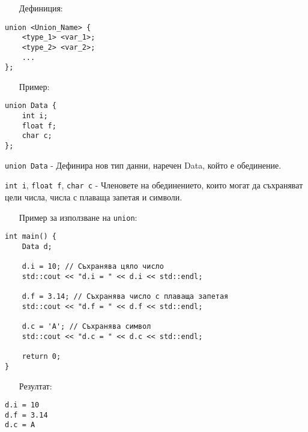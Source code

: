 \documentclass[oneside]{book}
\newcommand*{\code}[1]{\texttt{#1}}
\begin{document}
\begin{itemize}\item[Дефиниция:]\end{itemize}\vspace{-12pt}
\begin{mdframed}\begin{lstlisting}
union <Union_Name> {
    <type_1> <var_1>;
    <type_2> <var_2>;
    ...
};
\end{lstlisting}\end{mdframed}

\begin{itemize}\item[Пример:]\end{itemize}\vspace{-12pt}
\begin{mdframed}\begin{lstlisting}
union Data {
    int i;
    float f;
    char c;
};
\end{lstlisting}\end{mdframed}

\code{union Data} - Дефинира нов тип данни, наречен Data, който е обединение.

\code{int i}, \code{float f}, \code{char c} - Членовете на обединението, които могат да съхраняват цели числа, числа с плаваща запетая и символи.

\begin{itemize}\item[Пример] за използване на \code{union}:\end{itemize}
\begin{mdframed}\begin{lstlisting}
int main() {
    Data d;

    d.i = 10; // Съхранява цяло число
    std::cout << "d.i = " << d.i << std::endl;

    d.f = 3.14; // Съхранява число с плаваща запетая
    std::cout << "d.f = " << d.f << std::endl;

    d.c = 'A'; // Съхранява символ
    std::cout << "d.c = " << d.c << std::endl;

    return 0;
}
\end{lstlisting}\end{mdframed}

\begin{itemize}\item[Резултат:]\end{itemize}
\begin{mdframed}\begin{lstlisting}[language={}]
d.i = 10
d.f = 3.14
d.c = A
\end{lstlisting}\end{mdframed}
\end{document}
